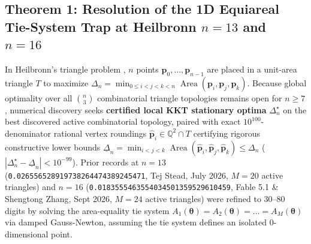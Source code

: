 \documentclass[11pt,a4paper]{article}
\begin{document}
\subsection{Theorem 1: Resolution of the 1D Equiareal Tie-System Trap at Heilbronn $n = 13$ and $n = 16$}

In Heilbronn's triangle problem \cite{cantrell2007,stead2026}, $n$ points $\mathbf{p}_0, \dots, \mathbf{p}_{n-1}$ are placed in a unit-area triangle $T$ to maximize $\Delta_n = \min_{0 \le i < j < k < n} \operatorname{Area}(\mathbf{p}_i, \mathbf{p}_j, \mathbf{p}_k)$. Because global optimality over all $\binom{n}{3}$ combinatorial triangle topologies remains open for $n \ge 7$, numerical discovery seeks \textbf{certified local KKT stationary optima} $\Delta_n^\star$ on the best discovered active combinatorial topology, paired with exact $10^{100}$-denominator rational vertex roundings $\hat{\mathbf{p}}_i \in \mathbb{Q}^2 \cap T$ certifying rigorous constructive lower bounds $\underline{\Delta}_n = \min_{i<j<k}\operatorname{Area}(\hat{\mathbf{p}}_i, \hat{\mathbf{p}}_j, \hat{\mathbf{p}}_k) \le \Delta_n$ ($|\Delta_n^\star - \underline{\Delta}_n| < 10^{-99}$). Prior records at $n=13$ (\texttt{0.026556528919738264474389245471}, Tej Stead, July 2026, $M=20$ active triangles) and $n=16$ (\texttt{0.0183555463554034501359529610459}, Fable 5.1 \& Shengtong Zhang, Sept 2026, $M=24$ active triangles) were refined to 30--80 digits by solving the area-equality tie system $A_1(\boldsymbol{\theta}) = A_2(\boldsymbol{\theta}) = \dots = A_M(\boldsymbol{\theta})$ via damped Gauss-Newton, assuming the tie system defines an isolated 0-dimensional point.
\end{document}
